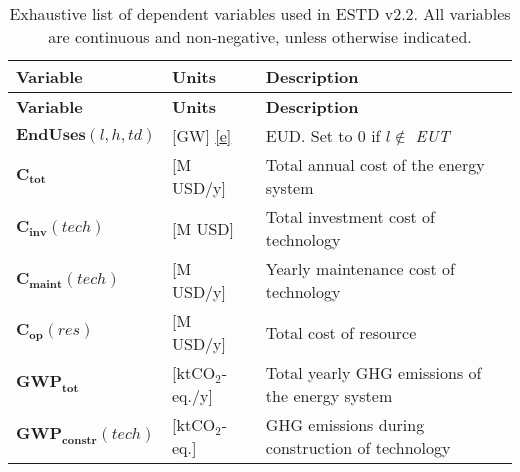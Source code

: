 \documentclass[
]{article}
\begin{document}
\begin{longtable}[]{@{}
  >{\raggedright\arraybackslash}p{}
  >{\raggedright\arraybackslash}p{}
  >{\raggedright\arraybackslash}p{}@{}}
\caption{Exhaustive list of dependent variables used in ESTD v2.2. All
variables are continuous and non-negative, unless otherwise
indicated.}\tabularnewline
\toprule\noalign{}
\begin{minipage}[b]{\linewidth}\raggedright
\textbf{Variable}
\end{minipage} & \begin{minipage}[b]{\linewidth}\raggedright
\textbf{Units}
\end{minipage} & \begin{minipage}[b]{\linewidth}\raggedright
\textbf{Description}
\end{minipage} \\
\midrule\noalign{}
\endfirsthead
\toprule\noalign{}
\begin{minipage}[b]{\linewidth}\raggedright
\textbf{Variable}
\end{minipage} & \begin{minipage}[b]{\linewidth}\raggedright
\textbf{Units}
\end{minipage} & \begin{minipage}[b]{\linewidth}\raggedright
\textbf{Description}
\end{minipage} \\
\midrule\noalign{}
\endhead
\bottomrule\noalign{}
\endlastfoot
\(\textbf{
EndUses}(l,h,td)\) & {[}GW{]} \hyperref[e]{{[}e{]}} & EUD. Set to 0 if
\(l \notin\) \emph{EUT} \\
\(\textbf{C}_
{\textbf{tot}}\) & {[}M USD/y{]} & Total annual cost of the energy
system \\
\(\textbf{C}_
{\textbf{inv}}(
tech)\) & {[}M USD{]} & Total investment cost of technology \\
\(\textbf{C}_
{\textbf{maint}}(
tech)\) & {[}M USD/y{]} & Yearly maintenance cost of technology \\
\(\textbf{C}_
{\textbf{op}}(
res)\) & {[}M USD/y{]} & Total cost of resource \\
\(\textbf{GWP}_
{\textbf{tot}}\) & {[}ktCO\(_2\)-eq./y{]} & Total yearly GHG emissions
of the energy system \\
\(\textbf{GWP}_
{\textbf{constr}}(
tech)\) & {[}ktCO\(_2\)-eq.{]} & GHG emissions during construction of
technology \\

\end{longtable}
\end{document}
